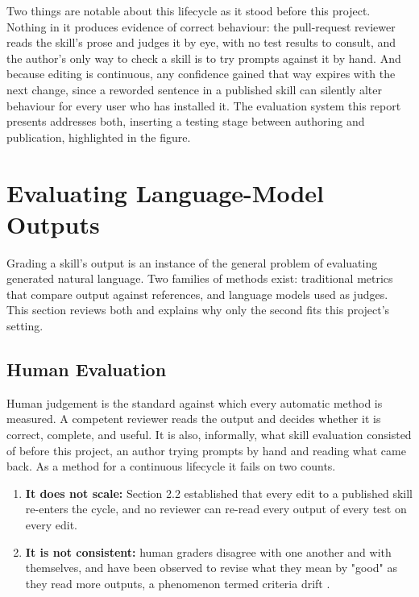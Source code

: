 \noindent Two things are notable about this lifecycle as it stood before this project. Nothing in it produces evidence of correct behaviour: the pull-request reviewer reads the skill's prose and judges it by eye, with no test results to consult, and the author's only way to check a skill is to try prompts against it by hand. And because editing is continuous, any confidence gained that way expires with the next change, since a reworded sentence in a published skill can silently alter behaviour for every user who has installed it. The evaluation system this report presents addresses both, inserting a testing stage between authoring and publication, highlighted in the figure.

\section{Evaluating Language-Model Outputs}

Grading a skill's output is an instance of the general problem of evaluating generated natural language. Two families of methods exist: traditional metrics that compare output against references, and language models used as judges. This section reviews both and explains why only the second fits this project's setting.

\subsection{Human Evaluation}
Human judgement is the standard against which every automatic method is measured. A competent reviewer reads the output and decides whether it is correct, complete, and useful. It is also, informally, what skill evaluation consisted of before this project, an author trying prompts by hand and reading what came back. As a method for a continuous lifecycle it fails on two counts. 

\begin{enumerate}
    \item \textbf{It does not scale:} Section 2.2 established that every edit to a published skill re-enters the cycle, and no reviewer can re-read every output of every test on every edit.
    \item \textbf{It is not consistent:} human graders disagree with one another and with themselves, and have been observed to revise what they mean by "good" as they read more outputs, a phenomenon termed criteria drift \cite{shankar2024validators}.
\end{enumerate}
 
